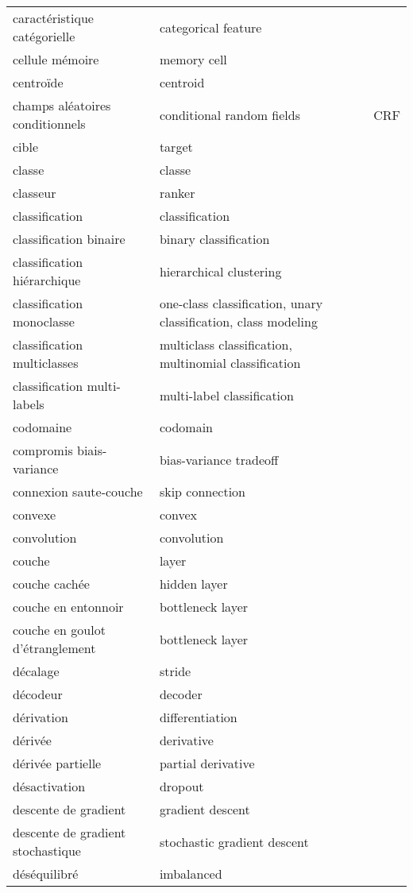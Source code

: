 \begin{longtable}{p{} p{} p{}}
caractéristique catégorielle & categorical feature &  \\ 
cellule mémoire & memory cell &  \\ 
centroïde & centroid &  \\ 
champs aléatoires conditionnels & conditional random fields & CRF \\ 
cible & target &  \\ 
classe & classe &  \\ 
classeur & ranker &  \\ 
classification & classification &  \\ 
classification binaire & binary classification &  \\ 
classification hiérarchique & hierarchical clustering &  \\ 
classification monoclasse & one-class classification, unary classification, class modeling &  \\ 
classification multiclasses & multiclass classification, multinomial classification &  \\ 
classification multi-labels & multi-label classification &  \\ 
codomaine & codomain &  \\ 
compromis biais-variance & bias-variance tradeoff &  \\ 
connexion saute-couche & skip connection &  \\ 
convexe & convex &  \\ 
convolution & convolution &  \\ 
couche & layer &  \\ 
couche cachée & hidden layer &  \\ 
couche en entonnoir & bottleneck layer &  \\ 
couche en goulot d’étranglement & bottleneck layer &  \\ 
décalage & stride &  \\ 
décodeur & decoder &  \\ 
dérivation & differentiation &  \\ 
dérivée & derivative &  \\ 
dérivée partielle & partial derivative &  \\ 
désactivation & dropout &  \\ 
descente de gradient & gradient descent &  \\ 
descente de gradient stochastique & stochastic gradient descent &  \\ 
déséquilibré & imbalanced &  \\ 

\end{longtable}
